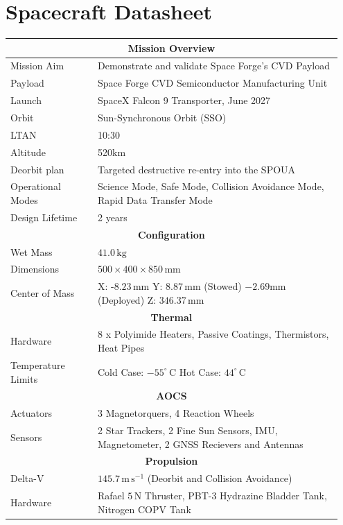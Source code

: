 \documentclass[a4paper, 11pt, conference]{IEEEtran}
\begin{document}
\section{Spacecraft Datasheet}
\begin{tabular}{p{0.25\linewidth} p{0.7\linewidth}}
\hline
\multicolumn{2}{c}{\textbf{Mission Overview}} \\
\hline
Mission Aim & Demonstrate and validate Space Forge's CVD Payload \\
Payload & Space Forge CVD Semiconductor Manufacturing Unit \\
Launch & SpaceX Falcon 9 Transporter, June 2027\\
Orbit & Sun-Synchronous Orbit (SSO)\\
LTAN & 10:30 \\
Altitude & 520km \\
Deorbit plan & Targeted destructive re-entry into the SPOUA\\
Operational Modes & Science Mode, Safe Mode, Collision Avoidance Mode, Rapid Data Transfer Mode \\
Design Lifetime & 2 years \\
\hline
\multicolumn{2}{c}{\textbf{Configuration}} \\
\hline
Wet Mass & $41.0\,\mathrm{kg}$ \\
Dimensions & $500\times400\times850\,\mathrm{mm}$ \\
Center of Mass & X: -$8.23\,\mathrm{mm}$ Y: $8.87\,\mathrm{mm}$ (Stowed) $-2.69\mathrm{mm}$ (Deployed) Z: $346.37\,\mathrm{mm}$ \\
\hline
\multicolumn{2}{c}{\textbf{Thermal}} \\
\hline
Hardware & 8 x Polyimide Heaters, Passive Coatings, Thermistors, Heat Pipes \\
Temperature Limits &  Cold Case: $-55^\circ\,\mathrm{C}$ Hot Case: $44^\circ\,\mathrm{C}$\\
\hline
\multicolumn{2}{c}{\textbf{AOCS}} \\
\hline
Actuators &  3 Magnetorquers, 4 Reaction Wheels\\
Sensors &  2 Star Trackers, 2 Fine Sun Sensors, IMU, Magnetometer, 2 GNSS Recievers and Antennas\\
\hline
\multicolumn{2}{c}{\textbf{Propulsion}} \\
\hline
Delta-V &  $145.7\,\mathrm{m\,s}^{-1}$ (Deorbit and  Collision Avoidance)\\
Hardware & Rafael $5\,\mathrm{N}$ Thruster, PBT-3 Hydrazine Bladder Tank, Nitrogen COPV Tank\\

\end{tabular}
\end{document}
